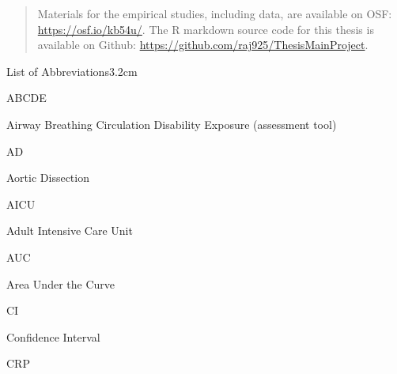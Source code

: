 \documentclass[a4paper, nobind]{templates/ociamthesis}
\begin{document}
\begin{romanpages}
\begin{abstract}
Materials for the empirical studies, including data, are available on OSF: \url{https://osf.io/kb54u/}. The R markdown source code for this thesis is available on Github: \url{https://github.com/raj925/ThesisMainProject}.
\end{abstract}



\dominitoc %

\flushbottom

\tableofcontents

\listoffigures
	\mtcaddchapter

\listoftables
  \mtcaddchapter
\begin{mclistof}{List of Abbreviations}{3.2cm}

\item[ABCDE]

Airway Breathing Circulation Disability Exposure (assessment tool)

\item[AD]

Aortic Dissection

\item[AICU]

Adult Intensive Care Unit

\item[AUC]

Area Under the Curve

\item[CI]

Confidence Interval

\item[CRP]


\end{mclistof}
\end{romanpages}
\end{document}
